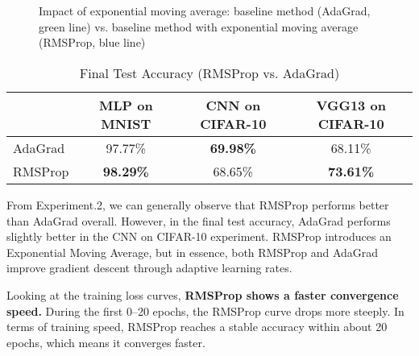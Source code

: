 \documentclass[12pt]{article}
\begin{document}
\begin{figure}[htbp]
    \centering
     \quad
     \\
     \quad
     \\
     \quad
    \caption{Impact of exponential moving average: baseline method (AdaGrad, green line) vs. baseline method with exponential moving average (RMSProp, blue line)}
    \label{fig:comprehensive_comparison}
\end{figure}

\begin{table}[H]
\centering
\caption{Final Test Accuracy (RMSProp vs. AdaGrad)}
\label{tab:rmsprop_vs_adagrad}
\begin{tabular}{|l|c|c|c|}
\hline
        & MLP on MNIST & CNN on CIFAR-10 & VGG13 on CIFAR-10 \\ \hline
AdaGrad & 97.77\%      & \textbf{69.98\%}  & 68.11\%           \\ \hline
RMSProp & \textbf{98.29\%} & 68.65\%         & \textbf{73.61\%}    \\ \hline
\end{tabular}
\end{table}

From Experiment.2, we can generally observe that RMSProp performs better than AdaGrad overall. However, in the final test accuracy, AdaGrad performs slightly better in the CNN on CIFAR-10 experiment. RMSProp introduces an Exponential Moving Average, but in essence, both RMSProp and AdaGrad improve gradient descent through adaptive learning rates.

Looking at the training loss curves, \textbf{RMSProp shows a faster convergence speed.} During the first 0–20 epochs, the RMSProp curve drops more steeply. In terms of training speed, RMSProp reaches a stable accuracy within about 20 epochs, which means it converges faster.
\end{document}
